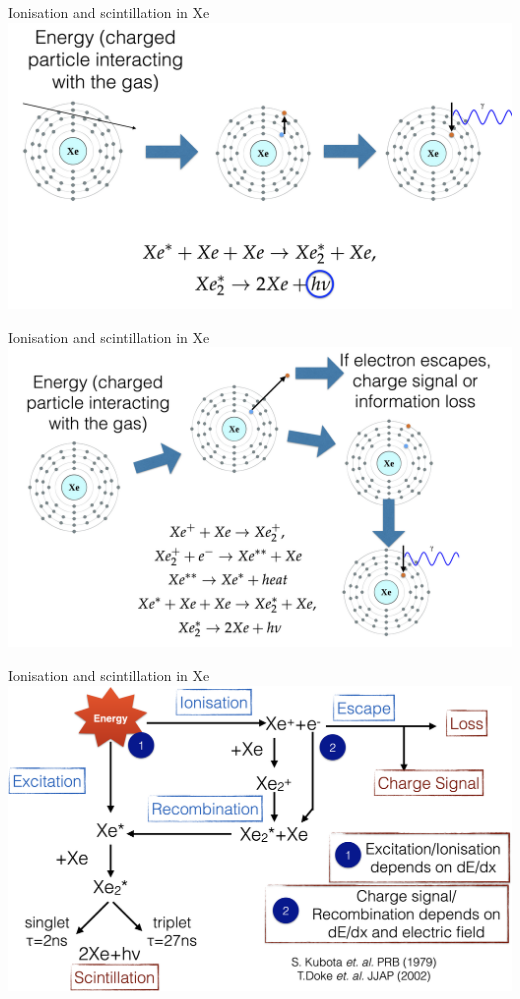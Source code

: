 \documentclass [aspectratio=169]{beamer}
\begin{document}
\begin{frame}{Ionisation and scintillation in Xe}
\includegraphics[scale=0.25]{xeio.png}
\end{frame}

\begin{frame}{Ionisation and scintillation in Xe}
\includegraphics[scale=0.25]{xeio2.png}
\end{frame}

\begin{frame}{Ionisation and scintillation in Xe}
\includegraphics[scale=0.25]{xeio3.png}
\end{frame}
\end{document}
